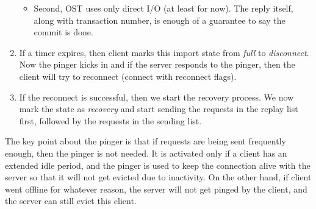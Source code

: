 \begin{enumerate}
\begin{itemize}
  \item Second, OST uses only direct I/O (at least for now). The reply itself,
  along with transaction number, is enough of a guarantee to say the commit is
  done.

  \end{itemize}

\item If a timer expires, then client marks this import state from \textit{full}
to \textit{disconnect}. Now the pinger kicks in and if the server responds to
the pinger, then the client will try to reconnect (connect with reconnect
flags). 

\item If the reconnect is successful, then we start the recovery process. We
now mark the state as \textit{recovery} and start sending the requests in the
replay list first, followed by the requests in the sending list.

\end{enumerate}

The key point about the pinger is that if requests are being sent frequently enough, 
then the pinger is not needed. It is activated only if a client 
has an extended idle period, and the pinger is used to keep the
connection alive with the server so that it will not get evicted due to
inactivity. On the other hand, if client went offline for whatever reason,
the server will not get pinged by the client, and the server can still evict this
client.

